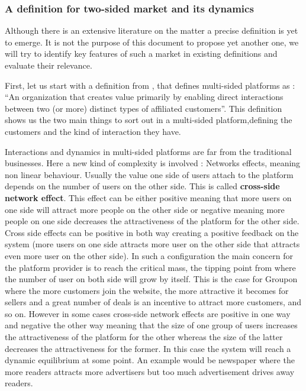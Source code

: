 \documentclass[10pt]{report}
\begin{document}
\subsubsection{A definition for two-sided market and its dynamics}

Although there is an extensive literature on the matter a precise definition is yet to emerge. It is not the purpose of this document to propose yet another one, we will try to identify key features of such a market in existing definitions and evaluate their relevance.

First, let us start with a definition from \autocite{Hagiu2011}, that defines multi-sided platforms as : \enquote{An organization that creates value primarily by enabling direct interactions between two (or more) distinct types of affiliated customers}. This definition shows us the two main things to sort out in a multi-sided platform,defining the customers and the kind of interaction they have. 

Interactions and dynamics in multi-sided platforms are far from the traditional businesses. Here a new kind of complexity is involved : Networks effects, meaning non linear behaviour. Usually the value one side of users attach to the platform depends on the number of users on the other side. This is called \textbf{cross-side network effect}. This effect can be either positive meaning that more users on one side will attract more people on the other side or negative meaning more people on one side decreases the attractiveness of the platform for the other side. Cross side effects can be positive in both way creating a positive feedback on the system (more users on one side attracts more user on the other side that attracts even more user on the other side). In such a configuration the main concern for the platform provider is to reach the critical mass, the tipping point from where the number of user on both side will grow by itself. \autocite{eisenmann2006strategies} This is the case for Groupon where the more customers join the website, the more attractive it becomes for sellers and a great number of deals is an incentive to attract more customers, and so on. However in some cases cross-side network effects are positive in one way and negative the other way meaning that the size of one group of users increases the attractiveness of the platform for the other whereas the size of the latter decreases the attractiveness for the former. In this case the system will reach a dynamic equilibrium at some point. An example would be newspaper where the more readers attracts more advertisers but too much advertisement drives away readers. \autocite{ParkerA05}
\end{document}
